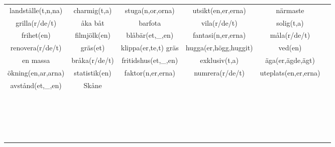 
\begin{center}
    \begin{adjustwidth}{-2.4cm}{}
        \begin{tabular}{|c c c c c c|}
            \hline
            landställe(t,n,na) & charmig(t,a) & stuga(n,or,orna) & utsikt(en,er,erna) & närmaste &  \\
            grilla(r/de/t) & åka båt & barfota & vila(r/de/t) & solig(t,a) &  \\
            frihet(en) & filmjölk(en) & blåbär(et,\_,en) & fantasi(n,er,erna) & måla(r/de/t) &  \\
            renovera(r/de/t) & gräs(et) & klippa(er,te,t) gräs & hugga(er,högg,huggit) & ved(en) &  \\
            en massa & bråka(r/de/t) & fritidshus(et,\_,en) & exklusiv(t,a) & äga(er,ägde,ägt) &  \\
            ökning(en,ar,arna) & statistik(en) & faktor(n,er,erna) & numrera(r/de/t) & uteplats(en,er,erna) &  \\
            avstånd(et,\_,en) & Skåne &  &  &  &  \\
             &  &  &  &  &  \\
             &  &  &  &  &  \\
             &  &  &  &  &  \\
             &  &  &  &  &  \\
             &  &  &  &  &  \\
             &  &  &  &  &  \\
             &  &  &  &  &  \\
             &  &  &  &  &  \\
             &  &  &  &  &  \\
             &  &  &  &  &  \\
             &  &  &  &  &  \\
             &  &  &  &  &  \\
             &  &  &  &  &  \\
             &  &  &  &  &  \\
             &  &  &  &  &  \\
             &  &  &  &  &  \\
             &  &  &  &  &  \\
             &  &  &  &  &  \\
             &  &  &  &  &  \\

\end{tabular}
\end{adjustwidth}
\end{center}
